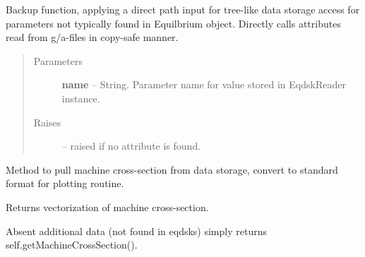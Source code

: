 \documentclass[letterpaper,10pt,english]{sphinxmanual}
\begin{document}
\begin{fulllineitems}
\begin{fulllineitems}
\begin{quote}
\begin{description}
\end{description}\end{quote}

\end{fulllineitems}


\begin{fulllineitems}
\label{eqtools:eqtools.eqdskreader.EqdskReader.getParam}
Backup function, applying a direct path input for tree-like data storage access
for parameters not typically found in Equilbrium object.  Directly calls attributes
read from g/a-files in copy-safe manner.
\begin{quote}\begin{description}
\item[{Parameters}] \leavevmode
\textbf{name} -- String.
Parameter name for value stored in EqdskReader instance.

\item[{Raises}] \leavevmode
{} -- raised if no attribute is found.

\end{description}\end{quote}

\end{fulllineitems}


\begin{fulllineitems}
\label{eqtools:eqtools.eqdskreader.EqdskReader.getMachineCrossSection}
Method to pull machine cross-section from data storage, convert to standard format for plotting routine.

\end{fulllineitems}


\begin{fulllineitems}
\label{eqtools:eqtools.eqdskreader.EqdskReader.getMachineCrossSectionFull}
Returns vectorization of machine cross-section.

Absent additional data (not found in eqdsks) simply returns self.getMachineCrossSection().

\end{fulllineitems}


\end{fulllineitems}
\end{document}
